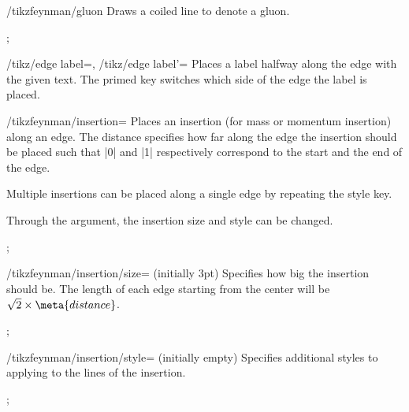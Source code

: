 \documentclass[a4paper,final]{ltxdoc}
\providecommand\oarg[1]{%
  {\ttfamily[}\meta{#1}{\ttfamily]}}
\begin{document}
\begin{key}{/tikzfeynman/gluon}
  Draws a coiled line to denote a gluon.

\begin{codeexample}[]
;
\end{codeexample}
\end{key}

\begin{keylist}{%
  /tikz/edge label=,
  /tikz/edge label'=}
  Places a label halfway along the edge with the given text.  The primed key switches which side of the edge the label is placed.
\end{keylist}

\begin{key}{/tikzfeynman/insertion=\opt{\oarg{options}}}
  Places an insertion (for mass or momentum insertion) along an edge.  The distance specifies how far along the edge the insertion should be placed such that |0| and |1| respectively correspond to the start and the end of the edge.

  Multiple insertions can be placed along a single edge by repeating the style key.

  Through the  argument, the insertion size and style can be changed.

\begin{codeexample}[]
;
\end{codeexample}

  \begin{key}{/tikzfeynman/insertion/size= (initially 3pt)}
    Specifies how big the insertion should be.  The length of each edge starting from the center will be \(\sqrt{2} \times \meta{distance}\).

\begin{codeexample}[]
;
\end{codeexample}
  \end{key}

  \begin{key}{/tikzfeynman/insertion/style= (initially \normalfont empty)}
    Specifies additional styles to applying to the lines of the insertion.

\begin{codeexample}[]
;
\end{codeexample}
  \end{key}
\end{key}
\end{document}
